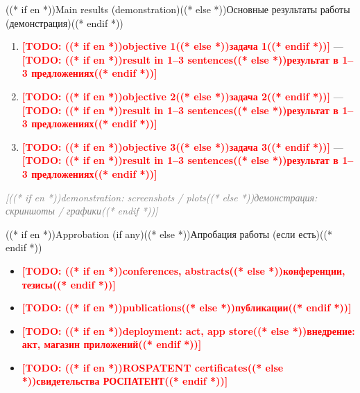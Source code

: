 \documentclass[aspectratio=169, 14pt]{beamer}
\newcommand{\todo}[1]{\textcolor{red}{\textbf{[TODO: #1]}}}
\begin{document}
\begin{frame}{((* if en *))Main results (demonstration)((* else *))Основные результаты работы (демонстрация)((* endif *))}
  \begin{enumerate}
    \item \todo{((* if en *))objective 1((* else *))задача 1((* endif *))} — \todo{((* if en *))result in 1--3 sentences((* else *))результат в 1--3 предложениях((* endif *))}
    \item \todo{((* if en *))objective 2((* else *))задача 2((* endif *))} — \todo{((* if en *))result in 1--3 sentences((* else *))результат в 1--3 предложениях((* endif *))}
    \item \todo{((* if en *))objective 3((* else *))задача 3((* endif *))} — \todo{((* if en *))result in 1--3 sentences((* else *))результат в 1--3 предложениях((* endif *))}
  \end{enumerate}

  \vspace{0.4em}
  \begin{center}
    \textcolor{gray}{\itshape [((* if en *))demonstration: screenshots / plots((* else *))демонстрация: скриншоты / графики((* endif *))]}
  \end{center}
\end{frame}

\begin{frame}{((* if en *))Approbation (if any)((* else *))Апробация работы (если есть)((* endif *))}
  \begin{itemize}
    \item \todo{((* if en *))conferences, abstracts((* else *))конференции, тезисы((* endif *))}
    \item \todo{((* if en *))publications((* else *))публикации((* endif *))}
    \item \todo{((* if en *))deployment: act, app store((* else *))внедрение: акт, магазин приложений((* endif *))}
    \item \todo{((* if en *))ROSPATENT certificates((* else *))свидетельства РОСПАТЕНТ((* endif *))}
  \end{itemize}
\end{frame}
\end{document}
